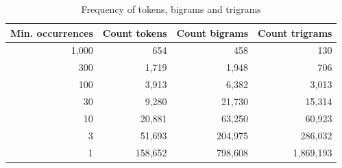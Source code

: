 \documentclass[article,type=msc,colorback,accentcolor=tud7b]{tudthesis}
\begin{document}
	

	\begin{table}[H]
	  \begin{tabular}{ | r | r | r | r | }
		\hline
		Min. occurrences & Count tokens & Count bigrams & Count trigrams \\ \hline
		1,000 & 654 & 458 & 130 \\ \hline
		300 & 1,719 & 1,948 & 706 \\ \hline
		100 & 3,913 & 6,382 & 3,013 \\ \hline
		30 & 9,280 & 21,730 & 15,314 \\ \hline
		10 & 20,881 & 63,250 & 60,923 \\ \hline
		3 & 51,693 & 204,975 & 286,032 \\ \hline
		1 & 158,652 & 798,608 & 1,869,193 \\ \hline
	  \end{tabular}
      \caption{Frequency of tokens, bigrams and trigrams}
      \label{tab:frequency_tokens_bigrams_trigrams}
	\end{table}
  
    \begin{figure}[H]
      \begin{floatrow}
      \end{floatrow}
    \end{figure}
\end{document}
